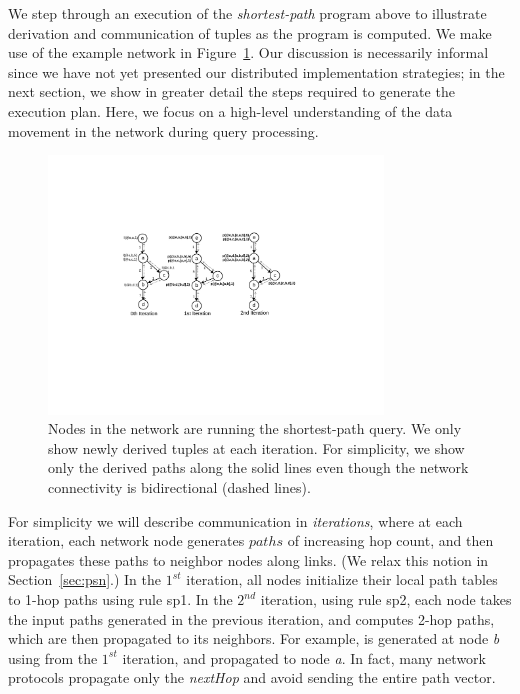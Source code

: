 We step through an execution of the {\em shortest-path} \Dlog program
above to illustrate derivation and communication of tuples as the
program is computed. We make use of the example network in
Figure~\ref{SP example}.  Our discussion is necessarily informal since
we have not yet presented our distributed implementation strategies;
in the next section, we show in greater detail the steps required to
generate the execution plan.  Here, we focus on a high-level
understanding of the data movement in the network during query
processing.


\begin{figure}[ht]
\centering
  \includegraphics[width=3.5in]{graphs/example}
\caption{\label{SP example}{\small Nodes in the network are running
    the shortest-path query. We only show newly derived tuples at each
    iteration. For simplicity, we show only the derived paths along the
    solid lines even though the network connectivity is bidirectional
    (dashed lines).}}
\end{figure}                                              

For simplicity we will describe communication in {\em iterations}, where at each
iteration, each network node generates $paths$ of increasing hop
count, and then propagates these paths to neighbor nodes along
links. (We relax this notion in Section~\ref{sec:psn}.)  In the $1^{st}$ iteration, all nodes initialize their local
path tables to 1-hop paths using rule sp1. In the $2^{nd}$ iteration,
using rule sp2, each node takes the input paths generated in the
previous iteration, and computes 2-hop paths, which are then
propagated to its neighbors. For example,  is
generated at node {\em b} using  from the
$1^{st}$ iteration, and propagated to node {\em a}. In fact, many
network protocols propagate only the {\em nextHop} and avoid sending
the entire path vector.

